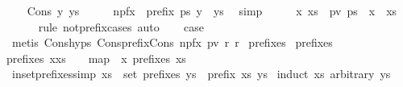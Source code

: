 \begin{isabellebody}
\isamarkupfalse%
\isanewline
\ \ \isamarkupfalse%
\ {\isacharparenleft}Cons\ y\ ys{\isacharparenright}\isanewline
\ \ \isamarkupfalse%
\ \isamarkupfalse%
\ npfx{\isacharcolon}\ {\isachardoublequoteopen}{\isasymnot}\ prefix\ ps\ {\isacharparenleft}y\ {\isacharhash}\ ys{\isacharparenright}{\isachardoublequoteclose}\ \isamarkupfalse%
\ simp\isanewline
\ \ \isamarkupfalse%
\ \isamarkupfalse%
\ x\ xs\ \ pv{\isacharcolon}\ {\isachardoublequoteopen}ps\ {\isacharequal}\ x\ {\isacharhash}\ xs{\isachardoublequoteclose}\isanewline
\ \ \ \ \isamarkupfalse%
\ {\isacharparenleft}rule\ not{\isacharunderscore}prefix{\isacharunderscore}cases{\isacharparenright}\ auto\isanewline
\ \ \isamarkupfalse%
\ {\isacharquery}case\ \isamarkupfalse%
\ {\isacharparenleft}metis\ Cons{\isachardot}hyps\ Cons{\isacharunderscore}prefix{\isacharunderscore}Cons\ npfx\ pv\ r{}\ r{}{\isacharparenright}\isanewline
{}\isamarkupfalse%
%
\endisatagproof
{\isafoldproof}%
%
\isadelimproof
%
\endisadelimproof
%
\isadelimdocument
%
\endisadelimdocument
%
\isatagdocument
%
\isamarkuptrue%
%
\endisatagdocument
{\isafolddocument}%
%
\isadelimdocument
%
\endisadelimdocument
{}\isamarkupfalse%
\ prefixes\ \isanewline
{\isachardoublequoteopen}prefixes\ {\isacharbrackleft}{\isacharbrackright}\ {\isacharequal}\ {\isacharbrackleft}{\isacharbrackleft}{\isacharbrackright}{\isacharbrackright}{\isachardoublequoteclose}\ {\isacharbar}\isanewline
{\isachardoublequoteopen}prefixes\ {\isacharparenleft}x{\isacharhash}xs{\isacharparenright}\ {\isacharequal}\ {\isacharbrackleft}{\isacharbrackright}\ {\isacharhash}\ map\ {\isacharparenleft}{\isacharparenleft}{\isacharhash}{\isacharparenright}\ x{\isacharparenright}\ {\isacharparenleft}prefixes\ xs{\isacharparenright}{\isachardoublequoteclose}\isanewline
\isanewline
{}\isamarkupfalse%
\ in{\isacharunderscore}set{\isacharunderscore}prefixes{\isacharbrackleft}simp{\isacharbrackright}{\isacharcolon}\ {\isachardoublequoteopen}xs\ {\isasymin}\ set\ {\isacharparenleft}prefixes\ ys{\isacharparenright}\ {\isasymlongleftrightarrow}\ prefix\ xs\ ys{\isachardoublequoteclose}\isanewline
%
\isadelimproof
%
\endisadelimproof
%
\isatagproof
{}\isamarkupfalse%
\ {\isacharparenleft}induct\ xs\ arbitrary{\isacharcolon}\ ys{\isacharparenright}\isanewline
\ \ \isamarkupfalse%

\end{isabellebody}
